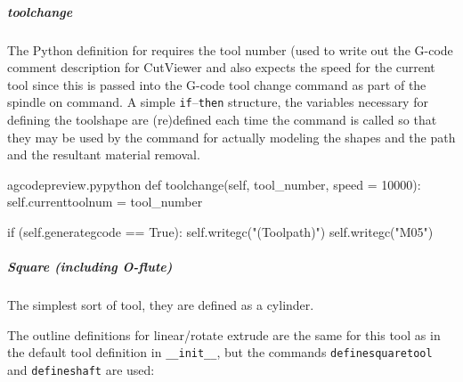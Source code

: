 \documentclass{ltxdoc}
\begin{document}
\subparagraph{toolchange}

The Python definition for  requires the tool number (used to write out the G-code comment description for CutViewer and also expects the speed for the current tool since this is passed into the G-code tool change command as part of the spindle on command. A simple \verb|if|--\verb|then| structure, the variables necessary for defining the toolshape are (re)defined each time the command is called so that they may be used by the command  for actually modeling the shapes and the path and the resultant material removal.

\lstset{firstnumber=\thegcpy}
\begin{writecode}{a}{gcodepreview.py}{python}
    def toolchange(self, tool_number, speed = 10000):
        self.currenttoolnum = tool_number

        if (self.generategcode == True):
            self.writegc("(Toolpath)")
            self.writegc("M05")

\end{writecode}
\addtocounter{gcpy}{7}

\subparagraph{Square (including O-flute)}

The simplest sort of tool, they are defined as a cylinder.


\lstset{firstnumber=\thegcpy}
\addtocounter{gcpy}{8}

The outline definitions for linear/rotate extrude are the same for this tool as in the default tool definition in \verb|__init__|, but the commands \verb|definesquaretool| and \verb|defineshaft| are used:
\end{document}
